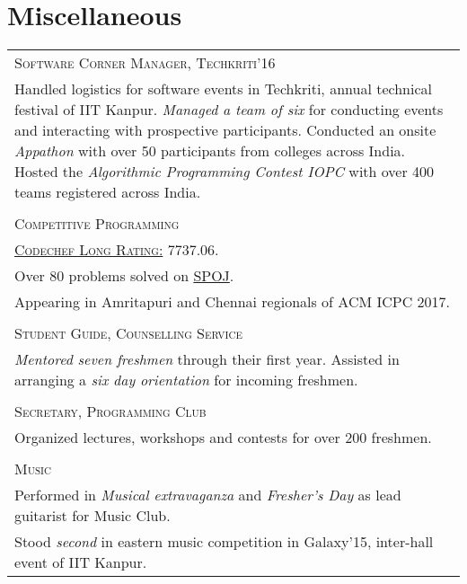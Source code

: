 \documentclass[a4paper,10pt]{article}
\begin{document}
\section{Miscellaneous}
\begin{longtable}{p{13cm}}
\large \textsc{Software Corner Manager, Techkriti'16}\\
Handled logistics for software events in Techkriti, annual technical festival of IIT Kanpur. \textit{Managed a team of six} for conducting events and interacting with prospective participants. Conducted an onsite \textit{Appathon} with over 50 participants from colleges across India. Hosted the \textit{Algorithmic Programming Contest IOPC} with over 400 teams registered across India.\\ \\
\large \textsc{Competitive Programming}\\
\href{https://www.codechef.com/users/architsh}{\textsc{Codechef Long Rating:}} 7737.06.\\
Over 80 problems solved on \href{http://www.spoj.com/users/architsh/}{SPOJ}.\\
Appearing in Amritapuri and Chennai regionals of ACM ICPC 2017.\\ \\
\large \textsc{Student Guide, Counselling Service}\\
\textit{Mentored seven freshmen} through their first year. Assisted in arranging a \textit{six day orientation} for incoming freshmen.\\ \\
\large \textsc{Secretary, Programming Club}\\
Organized lectures, workshops and contests for over 200 freshmen.
\\ \\
\large \textsc{Music}\\
Performed in \textit{Musical extravaganza} and \textit{Fresher's Day} as lead guitarist for Music Club.\\
Stood \textit{second} in eastern music competition in Galaxy'15, inter-hall event of IIT Kanpur.
\end{longtable}
\end{document}
